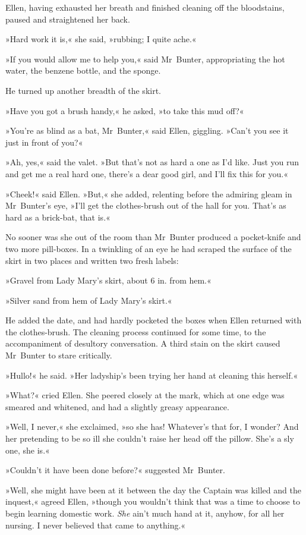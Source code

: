 Ellen, having exhausted her breath and finished cleaning off the bloodstains, paused and straightened her back.

»Hard work it is,« she said, »rubbing; I quite ache.«

»If you would allow me to help you,« said Mr~Bunter, appropriating the hot water, the benzene bottle, and the sponge.

He turned up another breadth of the skirt.

»Have you got a brush handy,« he asked, »to take this mud off?«

»You're as blind as a bat, Mr~Bunter,« said Ellen, giggling. »Can't you see it just in front of you?«

»Ah, yes,« said the valet. »But that's not as hard a one as I'd like.  Just you run and get me a real hard one, there's a dear good girl, and I'll fix this for you.«

»Cheek!« said Ellen. »But,« she added, relenting before the admiring gleam in Mr~Bunter's eye, »I'll get the clothes-brush out of the hall for you. That's as hard as a brick-bat, that is.«

No sooner was she out of the room than Mr~Bunter produced a pocket-knife and two more pill-boxes. In a twinkling of an eye he had scraped the surface of the skirt in two places and written two fresh labels:

»Gravel from Lady Mary's skirt, about 6 in. from hem.«

»Silver sand from hem of Lady Mary's skirt.«

He added the date, and had hardly pocketed the boxes when Ellen returned with the clothes-brush. The cleaning process continued for some time, to the accompaniment of desultory conversation. A third stain on the skirt caused Mr~Bunter to stare critically.

»Hullo!« he said. »Her ladyship's been trying her hand at cleaning this herself.«

»What?« cried Ellen. She peered closely at the mark, which at one edge was smeared and whitened, and had a slightly greasy appearance.

»Well, I never,« she exclaimed, »so she has! Whatever's that for, I wonder? And her pretending to be so ill she couldn't raise her head off the pillow. She's a sly one, she is.«

»Couldn't it have been done before?« suggested Mr~Bunter.

»Well, she might have been at it between the day the Captain was killed and the inquest,« agreed Ellen, »though you wouldn't think that was a time to choose to begin learning domestic work. \textit{She} ain't much hand at it, anyhow, for all her nursing. I never believed that came to anything.«

